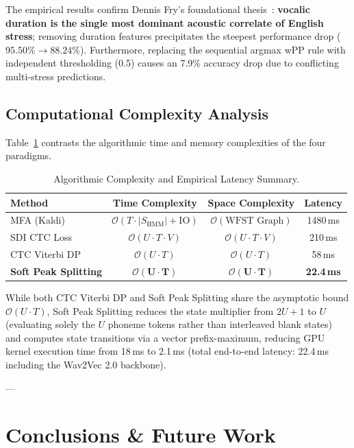 \documentclass[10pt,conference]{IEEEtran}
\begin{document}
The empirical results confirm Dennis Fry's foundational thesis~\cite{fry1958experiments}: \textbf{vocalic duration is the single most dominant acoustic correlate of English stress}; removing duration features precipitates the steepest performance drop ($95.50\% \to 88.24\%$). Furthermore, replacing the sequential argmax wPP rule with independent thresholding (0.5) causes an 7.9\% accuracy drop due to conflicting multi-stress predictions.

\subsection{Computational Complexity Analysis}
Table~\ref{tab:complexity} contrasts the algorithmic time and memory complexities of the four paradigms.

\begin{table}[h]
\caption{Algorithmic Complexity and Empirical Latency Summary.}
\label{tab:complexity}
\centering
\begin{tabular}{lccc}
\toprule
\textbf{Method} & \textbf{Time Complexity} & \textbf{Space Complexity} & \textbf{Latency} \\
\midrule
MFA (Kaldi) & $\mathcal{O}(T \cdot |S_{\text{HMM}}| + \text{IO})$ & $\mathcal{O}(\text{WFST Graph})$ & 1480\,ms \\
SDI CTC Loss & $\mathcal{O}(U \cdot T \cdot V)$ & $\mathcal{O}(U \cdot T \cdot V)$ & 210\,ms \\
CTC Viterbi DP & $\mathcal{O}(U \cdot T)$ & $\mathcal{O}(U \cdot T)$ & 58\,ms \\
\textbf{Soft Peak Splitting} & $\mathbf{\mathcal{O}(U \cdot T)}$ & $\mathbf{\mathcal{O}(U \cdot T)}$ & \textbf{22.4\,ms} \\
\bottomrule
\end{tabular}
\end{table}

While both CTC Viterbi DP and Soft Peak Splitting share the asymptotic bound $\mathcal{O}(U \cdot T)$, Soft Peak Splitting reduces the state multiplier from $2U+1$ to $U$ (evaluating solely the $U$ phoneme tokens rather than interleaved blank states) and computes state transitions via a vector prefix-maximum, reducing GPU kernel execution time from 18\,ms to 2.1\,ms (total end-to-end latency: 22.4\,ms including the Wav2Vec 2.0 backbone).

---

\section{Conclusions \& Future Work}
\label{sec:conclusion}
\end{document}
